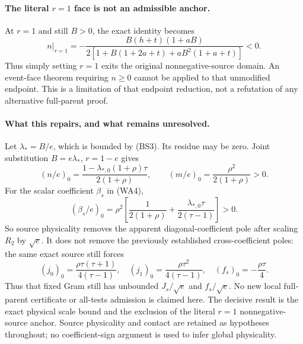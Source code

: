 \paragraph{The literal $r=1$ face is not an admissible anchor.}
At $r=1$ and still $B>0$, the exact identity becomes
\[
 n\big|_{r=1}
 =-\frac{B(h+t)(1+aB)}
 {2[1+B(1+2a+t)+aB^2(1+a+t)]}<0.                      \tag{BS4}
\]
Thus simply setting $r=1$ exits the original nonnegative-source
domain. An event-face theorem requiring $n\ge0$ cannot be applied
to that unmodified endpoint. This is a limitation of that endpoint
reduction, not a refutation of any alternative full-parent proof.

\paragraph{What this repairs, and what remains unresolved.}
Let $\lambda_*=B/e$, which is bounded by (BS3). Its residue may
be zero. Joint substitution $B=e\lambda_*$, $r=1-e$ gives
\[
 (n/e)_0=\frac{1-\lambda_{*,0}(1+\rho)\tau}{2(1+\rho)},
 \qquad (m/e)_0=\frac{\rho^2}{2(1+\rho)}>0.           \tag{BS5}
\]
For the scalar coefficient $\beta_s$ in (WA4),
\[
 (\beta_s/e)_0
 =\rho^2\left[\frac1{2(1+\rho)}
                   +\frac{\lambda_{*,0}\tau}{2(\tau-1)}\right]>0.
                                                               \tag{BS6}
\]
So source physicality removes the apparent diagonal-coefficient
pole after scaling $R_2$ by $\sqrt e$.
It does not remove the previously established cross-coefficient
poles: the same exact source still forces
\[
 (j_0)_0=\frac{\rho\tau(\tau+1)}{4(\tau-1)},\quad
 (j_1)_0=\frac{\rho\tau^2}{4(\tau-1)},\quad
 (f_s)_0=-\frac{\rho\tau}{4}.
\]
Thus that fixed Gram still has unbounded $J_s/\sqrt e$ and
$f_s/\sqrt e$. No new local full-parent certificate or all-tests
admission is claimed here. The decisive result is the exact
physical scale bound and the exclusion of the literal $r=1$
nonnegative-source anchor. Source physicality and contact are
retained as hypotheses throughout; no coefficient-sign argument
is used to infer global physicality.
